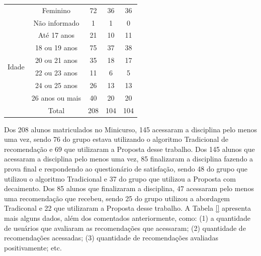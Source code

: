 \begin{table}[ht]
\begin{tabular}{ccccc}
                                        & Feminino                 & 72                                        & 36                   & 36                              \\
                                        & Não informado            & 1                                         & 1                    & 0                               \\
  \hline
  \multirow{6}{*}{Idade}                & Até 17 anos              & 21                                        & 10                   & 11                              \\
                                        & 18 ou 19 anos            & 75                                        & 37                   & 38                              \\
                                        & 20 ou 21 anos            & 35                                        & 18                   & 17                              \\
                                        & 22 ou 23 anos            & 11                                        & 6                    & 5                               \\
                                        & 24 ou 25 anos            & 26                                        & 13                   & 13                              \\
                                        & 26 anos ou mais          & 40                                        & 20                   & 20                              \\
  \hline
                                        & Total                    & 208                                       & 104                  & 104                             \\
\end{tabular}
\end{table}

Dos 208 alunos matriculados no Minicurso, 145 acessaram a disciplina pelo menos uma vez, sendo 76 do grupo estava
utilizando o algoritmo Tradicional de recomendação e 69 que utilizaram a Proposta desse trabalho. Dos 145 alunos que
acessaram a disciplina pelo menos uma vez, 85 finalizaram a disciplina fazendo a prova final e respondendo ao
questionário de satisfação, sendo 48 do grupo que utilizou o algoritmo Tradicional e 37 do grupo que utilizou a Proposta
com decaimento. Dos 85 alunos que finalizaram a disciplina, 47 acessaram pelo menos uma recomendação que recebeu, sendo
25 do grupo utilizou a abordagem Tradiconal e 22 que utilizaram a Proposta desse trabalho. A Tabela \ref{} apresenta
mais alguns dados, além dos comentados anteriormente, como: (1) a quantidade de usuários que avaliaram as recomendações que acessaram;
(2) quantidade de recomendações acessadas; (3) quantidade de recomendações avaliadas positivamente; etc.

